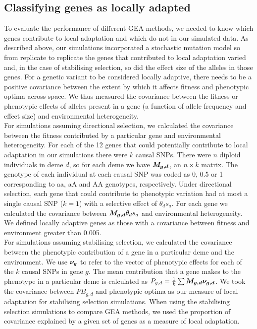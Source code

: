 \documentclass[10pt,twoside,lineno]{GSA_format}
\newcommand{\bm}[1]{\mbox{\boldmath{$#1$}}}
\begin{document}
\subsection{Classifying genes as locally adapted} 

To evaluate the performance of different GEA methods, we needed to know which genes contribute to local adaptation and which do not in our simulated data. As described above, our simulations incorporated a stochastic mutation model so from replicate to replicate the genes that contributed to local adaptation varied and, in the case of stabilising selection, so did the effect size of the alleles in those genes. For a genetic variant to be considered locally adaptive, there needs to be a positive covariance between the extent by which it affects fitness and phenotypic optima across space. We thus measured the covariance between the fitness or phenotypic effects of alleles present in a gene  (a function of allele frequency and effect size) and environmental heterogeneity. \\

For simulations assuming directional selection, we calculated the covariance between the fitness contributed by a particular gene and environmental heterogeneity. For each of the 12 genes that could potentially contribute to local adaptation in our simulations there were $k$ causal SNPs. There were $n$ diploid individuals in deme $d$, so for each deme we have $\bm{M_{g,d}}$, an $n \times k$ matrix. The genotype of each individual at each causal SNP was coded as 0, 0.5 or 1 corresponding to aa, aA and AA genotypes, respectively. Under directional selection, each gene that could contribute to phenotypic variation had at most a single causal SNP ($k = 1$) with a selective effect of $\theta_ds_a$. For each gene we calculated the covariance between $\bm{M_{g,d}}\theta_ds_a$ and environmental heterogeneity. We defined locally adaptive genes as those with a covariance between fitness and environment greater than 0.005. \\

For simulations assuming stabilising selection, we calculated the covariance between the phenotypic contribution of a gene in a particular deme and the environment. We use $\bm{\nu_g}$ to refer to the vector of phenotypic effects for each of the $k$ causal SNPs in gene $g$. The mean contribution that a gene makes to the phenotype in a particular deme is calculated as $P_{g,d} = \frac{1}{k}\sum \bm{M_{g,d} \nu_{g,d}}$. We took the covariance between $PB_{g,d}$ and phenotypic optima as our measure of local adaptation for stabilising selection simulations. When using the stabilising selection simulations to compare GEA methods, we used the proportion of covariance explained by a given set of genes as a measure of local adaptation.
\end{document}
